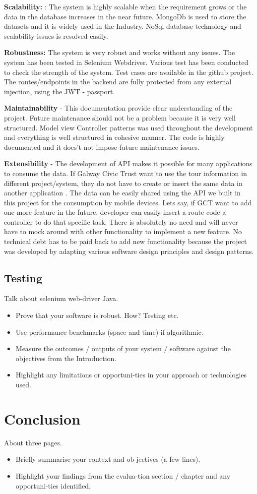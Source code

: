     \textbf{Scalability: } :  The system is highly scalable when the requirement grows or the data in the database increases in the near future. MongoDb is used to store the datasets and it is widely used in the Industry. NoSql database technology and scalability issues is resolved easily. 
    
     \textbf{Robustness: } The system is very robust and works without any issues.
     The system has been tested in Selenium Webdriver. Various test has been conducted to check the strength of the system. Test cases are available in the github project. The routes/endpoints in the backend are fully protected from any external injection, using the JWT - passport. 
     
     
    \textbf{Maintainability} - This documentation provide clear understanding of the project. Future maintenance should not be a problem because it is very well structured. Model view Controller patterns was used throughout the development and everything is well structured in cohesive manner. The code is highly documented and it does't not impose future maintenance issues.
    
    \textbf{Extensibility} - The development of API makes it possible for many applications to consume the data. If Galway Civic Trust want to use the tour information in different project/system, they do not have to create or insert the same data in another application . The data can be easily shared using the API we built in this project for the consumption by mobile devices.
    Lets say, if GCT want to add one more feature in the future, developer can easily insert a route code a controller to do that specific task. There is absolutely no need and will never have to mock around with other functionality to implement a new feature. No technical debt has to be paid back to add new functionality because the project was developed by adapting various software design principles and design patterns. 
    
    
	\section{Testing}
	Talk about selenium web-driver Java.
	
\begin{itemize}
	\item Prove that your software is robust. How? Testing etc. 
	\item Use performance benchmarks (space and time) if algorithmic.
	\item Measure the outcomes / outputs of your system / software against the objectives from the Introduction.
	\item Highlight any limitations or opportuni-ties in your approach or technologies used.
\end{itemize}

\chapter{Conclusion}
About three pages.

\begin{itemize}
	\item Briefly summarise your context and ob-jectives (a few lines).
	\item Highlight your findings from the evalua-tion section / chapter and any opportuni-ties identified.
\end{itemize}
